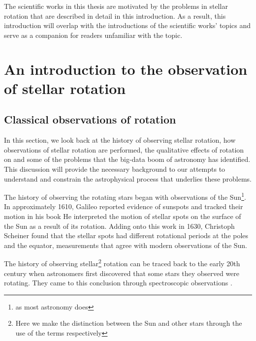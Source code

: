 The scientific works in this thesis are motivated by the problems in stellar rotation that are described in detail in this introduction. As a result, this introduction will overlap with the introductions of the scientific works' topics and serve as a companion for readers unfamiliar with the topic.

\section{An introduction to the observation of stellar rotation}
\label{sec:history}

\subsection{Classical observations of rotation}


In this section, we look back at the history of observing stellar rotation, how observations of stellar rotation are performed, the qualitative effects of rotation on  and some of the problems that the big-data boom of astronomy has identified.
This discussion will provide the necessary background to our attempts to understand and constrain the astrophysical process that underlies these problems.

The history of observing the rotating stars began with observations of the Sun\footnote{as most astronomy does}. 
In approximately 1610, Galileo reported evidence of sunspots and tracked their motion in his book  
He interpreted the motion of stellar spots on the surface of the Sun as a result of its rotation. 
Adding onto this work in 1630, Christoph Scheiner found that the stellar spots had different rotational periods at the poles and the equator, measurements that agree with modern observations of the Sun. 

The history of observing stellar\footnote{Here we make the distinction between the Sun and other stars through the use of the terms  respectively} rotation can be traced back to the early 20th century when astronomers first discovered that some stars they observed were rotating. 
They came to this conclusion through spectroscopic observations \citep{elvey_contours_1929, struve_stellar_1930, struve_axial_1930}.

